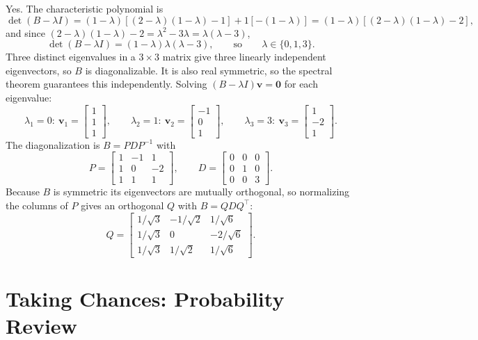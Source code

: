 \documentclass[11pt]{article}
\begin{document}
Yes. The characteristic polynomial is
\[
  \det(B - \lambda I) = (1-\lambda)[(2-\lambda)(1-\lambda) - 1] + 1[-(1-\lambda)]
  = (1-\lambda)[(2-\lambda)(1-\lambda) - 2],
\]
and since $(2-\lambda)(1-\lambda) - 2 = \lambda^2 - 3\lambda = \lambda(\lambda - 3)$,
\[
  \det(B - \lambda I) = (1-\lambda)\lambda(\lambda-3),
  \qquad \text{so} \qquad
  \lambda \in \{0, 1, 3\}.
\]
Three distinct eigenvalues in a $3 \times 3$ matrix give three linearly independent eigenvectors, so
$B$ is diagonalizable. It is also real symmetric, so the spectral theorem guarantees this independently.
Solving $(B - \lambda I)\mathbf{v} = \mathbf{0}$ for each eigenvalue:
\[
  \lambda_1 = 0: \ \mathbf{v}_1 = \begin{bmatrix} 1\\1\\1\end{bmatrix}, \qquad
  \lambda_2 = 1: \ \mathbf{v}_2 = \begin{bmatrix} -1\\0\\1\end{bmatrix}, \qquad
  \lambda_3 = 3: \ \mathbf{v}_3 = \begin{bmatrix} 1\\-2\\1\end{bmatrix}.
\]
The diagonalization is $B = PDP^{-1}$ with
\[
  P = \begin{bmatrix} 1&-1&1\\1&0&-2\\1&1&1\end{bmatrix}, \qquad
  D = \begin{bmatrix} 0&0&0\\0&1&0\\0&0&3\end{bmatrix}.
\]
Because $B$ is symmetric its eigenvectors are mutually orthogonal, so normalizing the columns of $P$
gives an orthogonal $Q$ with $B = QDQ^\top$:
\[
  Q = \begin{bmatrix}
    1/\sqrt{3} & -1/\sqrt{2} & 1/\sqrt{6}\\
    1/\sqrt{3} & 0 & -2/\sqrt{6}\\
    1/\sqrt{3} & 1/\sqrt{2} & 1/\sqrt{6}
  \end{bmatrix}.
\]

\section{Taking Chances: Probability Review}
\end{document}
